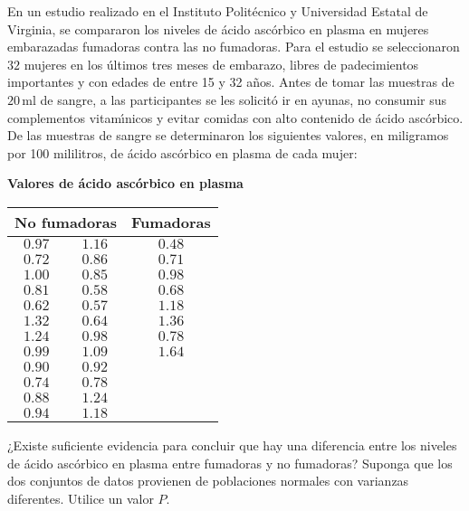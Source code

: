 \begin{enunciado}
 En un estudio realizado en el Instituto Polit\'ecnico y Universidad Estatal de Virginia, se compararon los niveles de \'acido asc\'orbico en plasma en mujeres embarazadas fumadoras contra las no fumadoras. Para el estudio se seleccionaron $32$ mujeres en los \'ultimos tres meses de embarazo, libres de padecimientos importantes y con edades de entre 15 y 32 a\~nos. Antes de tomar las muestras de $20\,$ml de sangre, a las participantes se les solicit\'o ir en ayunas, no consumir sus complementos vitam\'{\i}nicos y evitar comidas con alto contenido de \'acido asc\'orbico. De las muestras de sangre se determinaron los siguientes valores, en miligramos por 100 mililitros, de \'acido asc\'orbico en plasma de cada mujer:
 \begin{center}
  \textbf{Valores de \'acido asc\'orbico en plasma} \\
  \begin{tabular}{ccccc}
   \hline 
   \multicolumn{2}{c}{\textbf{No fumadoras}} & \multicolumn{3}{c}{\textbf{Fumadoras}} \\
   \hline 
   $0.97$ & $1.16$ & \hspace{1cm} & $0.48$ & \hspace{1cm} \\
   $0.72$ & $0.86$ & & $0.71$ \\
   $1.00$ & $0.85$ & & $0.98$ \\
   $0.81$ & $0.58$ & & $0.68$ \\
   $0.62$ & $0.57$ & & $1.18$ \\
   $1.32$ & $0.64$ & & $1.36$ \\
   $1.24$ & $0.98$ & & $0.78$ \\
   $0.99$ & $1.09$ & & $1.64$ \\
   $0.90$ & $0.92$ \\
   $0.74$ & $0.78$ \\
   $0.88$ & $1.24$ \\
   $0.94$ & $1.18$
  \end{tabular}
 \end{center}
 ¿Existe suficiente evidencia para concluir que hay una diferencia entre los niveles de \'acido asc\'orbico en plasma entre fumadoras y no fumadoras? Suponga que los dos conjuntos de datos provienen de poblaciones normales con varianzas diferentes. Utilice un valor $P$.
\end{enunciado}


